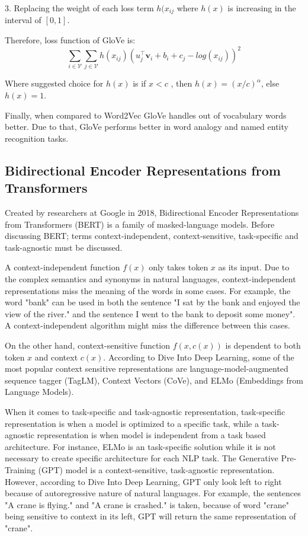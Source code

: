 \documentclass[man]{apa7}
\begin{document}
3. Replacing the weight of each loss term $h(x_{ij}$ where $h(x)$ is increasing in the interval of $[0,1]$.
 
Therefore, loss function of GloVe is:
\begin{equation}
\sum_{i \in \mathcal{V}} \sum_{j \in \mathcal{V}} h(x_{ij})(u_j^\top \mathbf{v}_i + b_i +c_j -log(x_{ij}))^2
\end{equation}


Where suggested choice for $h(x)$ is if $x < c$ , then $h(x) = (x/c)^\alpha$, else $h(x) = 1$. 

Finally, when compared to Word2Vec GloVe handles out of vocabulary words better. Due to that, GloVe performs better in word analogy and named entity recognition tasks. 

\subsection{Bidirectional Encoder Representations from Transformers}
Created by researchers at Google in 2018, Bidirectional Encoder Representations from Transformers (BERT) is a family of masked-language models. Before discussing BERT; terms context-independent, context-sensitive, task-specific and task-agnostic must be discussed.

A context-independent function $f(x)$ only takes token $x$ as its input. Due to the complex semantics and synonyms in natural languages, context-independent representations miss the meaning of the words in some cases. For example, the word "bank" can be used in both the sentence "I sat by the bank and enjoyed the view of the river." and the sentence I went to the bank to deposit some money". A context-independent algorithm might miss the difference between this cases.

On the other hand, context-sensitive function $f(x,c(x))$ is dependent to both token $x$ and context $c(x)$. According to Dive Into Deep Learning, some of the most popular context sensitive representations are language-model-augmented sequence tagger (TagLM), Context Vectors (CoVe), and ELMo (Embeddings from Language Models).

When it comes to task-specific and task-agnostic representation, task-specific representation is when a model is optimized to a specific task, while a task-agnostic representation is when model is independent from a task based architecture. For instance, ELMo is an task-specific solution while it is not necessary to create specific architecture for each NLP task. The Generative Pre-Training  (GPT) model is a context-sensitive, task-agnostic representation. However, according to Dive Into Deep Learning, GPT only look left to right because of autoregressive nature of natural languages. For example, the sentences "A crane is flying." and "A crane is crashed." is taken, because of word "crane" being sensitive to context in its left, GPT will return the same representation of "crane".
\end{document}

